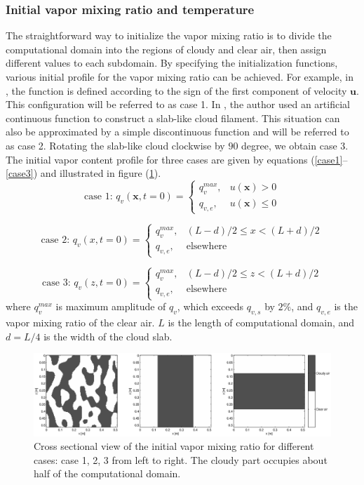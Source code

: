 \documentclass[12pt]{article}
\begin{document}
\subsubsection{Initial vapor mixing ratio and temperature}
The straightforward way to initialize the vapor mixing ratio is to divide the computational domain into the regions of cloudy and clear air, then assign different values to each subdomain. By specifying the initialization functions, various initial profile for the vapor mixing ratio can be achieved. For example, in \cite{And04}, the function is defined according to the sign of the first component of velocity $\mathbf{u}$. This configuration will be referred to as case 1. In \cite{Kumar11}, the author used an artificial continuous function to construct a slab-like cloud filament. This situation can also be approximated by a simple discontinuous function and will be referred to as case 2. Rotating the slab-like cloud clockwise by $90$ degree, we obtain case 3. The initial vapor content profile for three cases are given by equations (\ref{case1}--\ref{case3}) and illustrated in figure (\ref{fig:v_field_case123}).
\begin{equation}
\mbox{case 1: } q_v(\mathbf{x},t=0) = 
\begin{cases} 
q_v^{max}, & u(\mathbf{x}) > 0\\
q_{v,e}, & u(\mathbf{x}) \le 0
\end{cases}\label{case1}
\end{equation}

\begin{equation}
\mbox{case 2: } q_v(x,t=0) = 
\begin{cases} 
q_v^{max}, & (L-d)/2 \le x < (L+d)/2\\
q_{v,e}, & \mbox{elsewhere}
\end{cases}\label{case2}
\end{equation}

\begin{equation}
\mbox{case 3: } q_v(z,t=0) = 
\begin{cases} 
q_v^{max}, & (L-d)/2 \le z < (L+d)/2\\
q_{v,e}, & \mbox{elsewhere}
\end{cases}\label{case3}
\end{equation}
where $q_v^{max}$ is maximum amplitude of $q_v$, which exceeds $q_{v,s}$ by $2\%$, and $q_{v,e}$ is the vapor mixing ratio of the clear air. $L$ is the length of computational domain, and $d = L/4$ is the width of the cloud slab. 
\begin{figure}[H]
\includegraphics[width=1.0\textwidth]{Figures/v_field_case123}
\caption{Cross sectional view of the initial vapor mixing ratio for different cases: case 1, 2, 3 from left to right. The cloudy part occupies about half of the computational domain.\label{fig:v_field_case123}}
\end{figure}
\end{document}
